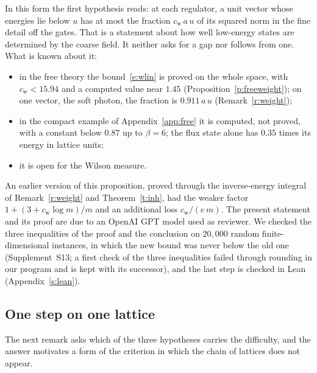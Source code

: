In this form the first hypothesis reads: at each regulator, a unit vector whose energies lie below $u$ has
at most the fraction $c_{\mathrm w}\,a\,u$ of its squared norm in the fine detail off the gates. That is a
statement about how well low-energy states are determined by the coarse field. It neither asks for a gap
nor follows from one. What is known about it:
\begin{itemize}
\item in the free theory the bound~\eqref{e:wlin} is proved on the whole space, with $c_{\mathrm w}<15.94$
and a computed value near $1.45$ (Proposition~\ref{p:freeweight}); on one vector, the soft photon, the
fraction is $0.911\,a\,u$ (Remark~\ref{r:weight});
\item in the compact example of Appendix~\ref{app:free} it is computed, not proved, with a constant below
$0.87$ up to $\beta=6$; the flux state alone has $0.35$ times its energy in lattice units;
\item it is open for the Wilson measure.
\end{itemize}

An earlier version of this proposition, proved through the inverse-energy integral of
Remark~\ref{r:weight} and Theorem~\ref{t:inh}, had the weaker factor $1+(3+c_{\mathrm w}\log m)/m$ and an
additional loss $c_{\mathrm w}/(e\,m)$. The present statement and its proof are due to an OpenAI GPT model
used as reviewer. We checked the three inequalities of the proof and the conclusion on $20{,}000$ random
finite-dimensional instances, in which the new bound was never below the old one (Supplement~S13; a first
check of the three inequalities failed through rounding in our program and is kept with its successor), and
the last step is checked in Lean (Appendix~\ref{s:lean}).

\subsection*{One step on one lattice}
The next remark asks which of the three hypotheses carries the difficulty, and the answer motivates a form
of the criterion in which the chain of lattices does not appear.

